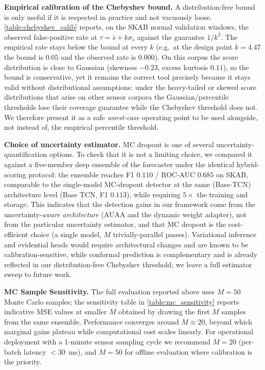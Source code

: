 \textbf{Empirical calibration of the Chebyshev bound.} A distribution-free bound is only useful if it is respected in practice and not vacuously loose. \cref{table:chebyshev_calib} reports, on the SKAB normal validation windows, the observed false-positive rate at $\tau=\bar{s}+k\sigma_s$ against the guarantee $1/k^2$. The empirical rate stays below the bound at every $k$ (e.g.\ at the design point $k=4.47$ the bound is $0.05$ and the observed rate is $0.000$). On this corpus the score distribution is close to Gaussian (skewness $-0.23$, excess kurtosis $0.11$), so the bound is conservative, yet it remains the correct tool precisely because it stays valid without distributional assumptions: under the heavy-tailed or skewed score distributions that arise on other sensor corpora the Gaussian/percentile thresholds lose their coverage guarantee while the Chebyshev threshold does not. We therefore present it as a safe \emph{worst-case} operating point to be used alongside, not instead of, the empirical percentile threshold.



\textbf{Choice of uncertainty estimator.} MC dropout is one of several uncertainty-quantification options. To check that it is not a limiting choice, we compared it against a five-member deep ensemble of the forecaster under the identical hybrid-scoring protocol: the ensemble reaches F1 $0.110$ / ROC-AUC $0.685$ on SKAB, comparable to the single-model MC-dropout detector at the same (Base-TCN) architecture level (Base TCN, F1 $0.113$), while requiring $5\times$ the training and storage. This indicates that the detection gains in our framework come from the uncertainty-\emph{aware architecture} (AUAA and the dynamic weight adapter), not from the particular uncertainty estimator, and that MC dropout is the cost-efficient choice (a single model, $M$ trivially-parallel passes). Variational inference and evidential heads would require architectural changes and are known to be calibration-sensitive, while conformal prediction is complementary and is already reflected in our distribution-free Chebyshev threshold; we leave a full estimator sweep to future work.

\textbf{MC Sample Sensitivity.} The full evaluation reported above uses $M=50$ Monte Carlo samples; the sensitivity table in \cref{table:mc_sensitivity} reports indicative MSE values at smaller $M$ obtained by drawing the first $M$ samples from the same ensemble. Performance converges around $M \approx 20$, beyond which marginal gains plateau while computational cost scales linearly. For operational deployment with a 1-minute sensor sampling cycle we recommend $M=20$ (per-batch latency $<30$~ms), and $M=50$ for offline evaluation where calibration is the priority.


